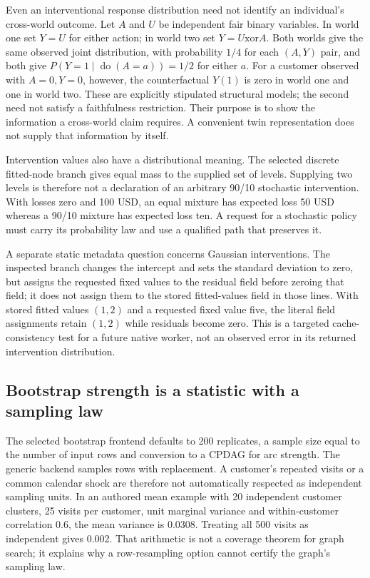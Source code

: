 Even an interventional response distribution need not identify an individual's cross-world outcome. Let $A$ and $U$ be independent fair binary variables. In world one set $Y=U$ for either action; in world two set $Y=U\mathbin{\mathrm{xor}}A$. Both worlds give the same observed joint distribution, with probability $1/4$ for each $(A,Y)$ pair, and both give $P(Y=1\mid\operatorname{do}(A=a))=1/2$ for either $a$. For a customer observed with $A=0,Y=0$, however, the counterfactual $Y(1)$ is zero in world one and one in world two. These are explicitly stipulated structural models; the second need not satisfy a faithfulness restriction. Their purpose is to show the information a cross-world claim requires. A convenient twin representation does not supply that information by itself.\citep{exec24_bnlearn_contract}

Intervention values also have a distributional meaning. The selected discrete fitted-node branch gives equal mass to the supplied set of levels. Supplying two levels is therefore not a declaration of an arbitrary 90/10 stochastic intervention. With losses zero and 100 USD, an equal mixture has expected loss 50 USD whereas a 90/10 mixture has expected loss ten. A request for a stochastic policy must carry its probability law and use a qualified path that preserves it.\citep{exec24_bnlearn_sources,exec24_bnlearn_contract}

A separate static metadata question concerns Gaussian interventions. The inspected branch changes the intercept and sets the standard deviation to zero, but assigns the requested fixed values to the residual field before zeroing that field; it does not assign them to the stored fitted-values field in those lines. With stored fitted values $(1,2)$ and a requested fixed value five, the literal field assignments retain $(1,2)$ while residuals become zero. This is a targeted cache-consistency test for a future native worker, not an observed error in its returned intervention distribution.\citep{exec24_bnlearn_sources,exec24_bnlearn_contract}

\subsection{Bootstrap strength is a statistic with a sampling law}
The selected bootstrap frontend defaults to 200 replicates, a sample size equal to the number of input rows and conversion to a CPDAG for arc strength. The generic backend samples rows with replacement. A customer's repeated visits or a common calendar shock are therefore not automatically respected as independent sampling units. In an authored mean example with 20 independent customer clusters, 25 visits per customer, unit marginal variance and within-customer correlation 0.6, the mean variance is 0.0308. Treating all 500 visits as independent gives 0.002. That arithmetic is not a coverage theorem for graph search; it explains why a row-resampling option cannot certify the graph's sampling law.\citep{exec24_bnlearn_sources,exec24_bnlearn_contract}

